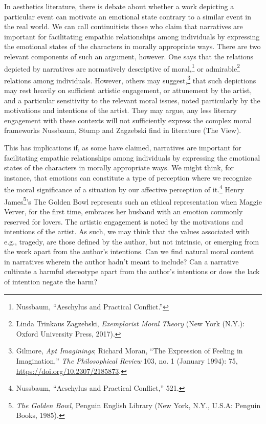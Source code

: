 \documentclass[phdthesis,12pt,final]{wuthesis}
\theoremstyle{definition}
\theoremstyle{definition}
\theoremstyle{definition}
\theoremstyle{definition}
\theoremstyle{remark}
\begin{document}
In aesthetics literature, there is debate about whether a work depicting a particular event can motivate an emotional state contrary to a similar event in the real world. We can call continuitists those who claim that narratives are important for facilitating empathic relationships among individuals by expressing the emotional states of the characters in morally appropriate ways. There are two relevant components of such an argument, however. One says that the relations depicted by narratives are normatively descriptive of moral,\footnote{Nussbaum, {``Aeschylus and Practical Conflict.''}} or admirable\footnote{Linda Trinkaus Zagzebski, \emph{Exemplarist {Moral Theory}} (New York (N.Y.): Oxford University Press, 2017).} relations among individuals. However, others may suggest,\footnote{Gilmore, \emph{Apt {Imaginings}}; Richard Moran, {``The {Expression} of {Feeling} in {Imagination},''} \emph{The Philosophical Review} 103, no. 1 (January 1994): 75, \url{https://doi.org/10.2307/2185873}.} that such depictions may rest heavily on sufficient artistic engagement, or attunement by the artist, and a particular sensitivity to the relevant moral issues, noted particularly by the motivations and intentions of the artist. They may argue, any less literary engagement with these contexts will not sufficiently express the complex moral frameworks Nussbaum, Stump and Zagzebski find in literature (The View).

This has implications if, as some have claimed, narratives are important for facilitating empathic relationships among individuals by expressing the emotional states of the characters in morally appropriate ways. We might think, for instance, that emotions can constitute a type of perception where we recognize the moral significance of a situation by our affective perception of it.\footnote{Nussbaum, {``Aeschylus and Practical Conflict,''} 521.} Henry James\footnote{\emph{The Golden Bowl}, Penguin {English} Library (New York, N.Y., U.S.A: Penguin Books, 1985).}'s The Golden Bowl represents such an ethical representation when Maggie Verver, for the first time, embraces her husband with an emotion commonly reserved for lovers. The artistic engagement is noted by the motivations and intentions of the artist. As such, we may think that the values associated with e.g., tragedy, are those defined by the author, but not intrinsic, or emerging from the work apart from the author's intentions. Can we find natural moral content in narratives wherein the author hadn't meant to include? Can a narrative cultivate a harmful stereotype apart from the author's intentions or does the lack of intention negate the harm?
\end{document}
